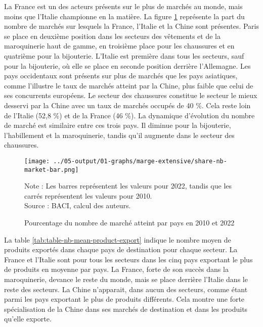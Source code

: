 \documentclass[french,10pt,a4paper]{article}
\begin{document}
La France est un des acteurs présents sur le plus de marchés au monde, mais moins que l'Italie championne en la matière. La figure \ref{fig:nb-market-bar} représente la part du nombre de marchés sur lesquels la France, l'Italie et la Chine sont présentes. Paris se place en deuxième position dans les secteurs des vêtements et de la maroquinerie haut de gamme, en troisième place pour les chaussures et en quatrième pour la bijouterie. L'Italie est première dans tous les secteurs, sauf pour la bijouterie, où elle se place en seconde position derrière l'Allemagne. Les pays occidentaux sont présents sur plus de marchés que les pays asiatiques, comme l'illustre le taux de marchés atteint par la Chine, plus faible que celui de ses concurrents européens. Le secteur des chaussures constitue le secteur le mieux desservi par la Chine avec un taux de marchés occupés de 40 \%. Cela reste loin de l'Italie (52,8 \%) et de la France (46 \%). La dynamique d'évolution du nombre de marché est similaire entre ces trois pays. Il diminue pour la bijouterie, l'habillement et la maroquinerie, tandis qu'il augmente dans le secteur des chaussures.

\begin{figure}[!h]
  \centering
  \texttt{[image: ../05-output/01-graphs/marge-extensive/share-nb-market-bar.png]}
  \captionsetup{justification=justified, singlelinecheck=false, font=small}
  \caption*{Note : Les barres représentent les valeurs pour 2022, tandis que les carrés représentent les valeurs pour 2010. \\
  Source : BACI, calcul des auteurs.}
  \captionsetup{justification=centering, singlelinecheck=true, font=normalsize}
  \caption{Pourcentage du nombre de marché atteint par pays en 2010 et 2022}
  \label{fig:nb-market-bar}
\end{figure}

La table \ref{tab:table-nb-mean-product-export} indique le nombre moyen de produits exportés dans chaque pays de destination pour chaque secteur. La France et l'Italie sont pour tous les secteurs dans les cinq pays exportant le plus de produits en moyenne par pays. La France, forte de son succès dans la maroquinerie, devance le reste du monde, mais se place derrière l'Italie dans le reste des secteurs. La Chine n'apparait, dans aucun des secteurs, comme étant parmi les pays exportant le plus de produits différents. Cela montre une forte spécialisation de la Chine dans ses marchés de destination et dans les produits qu'elle exporte. 
\end{document}
